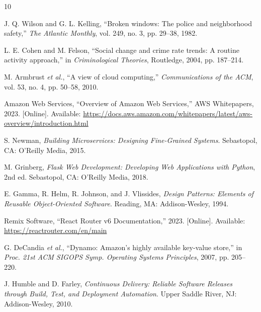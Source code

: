 \documentclass[conference]{IEEEtran}
\begin{document}
\begin{thebibliography}{10}

J. Q. Wilson and G. L. Kelling, ``Broken windows: The police and neighborhood safety,'' \textit{The Atlantic Monthly}, vol. 249, no. 3, pp. 29--38, 1982.

L. E. Cohen and M. Felson, ``Social change and crime rate trends: A routine activity approach,'' in \textit{Criminological Theories}, Routledge, 2004, pp. 187--214.

M. Armbrust \textit{et al.}, ``A view of cloud computing,'' \textit{Communications of the ACM}, vol. 53, no. 4, pp. 50--58, 2010.

Amazon Web Services, ``Overview of Amazon Web Services,'' AWS Whitepapers, 2023. [Online]. Available: \url{https://docs.aws.amazon.com/whitepapers/latest/aws-overview/introduction.html}

S. Newman, \textit{Building Microservices: Designing Fine-Grained Systems}. Sebastopol, CA: O'Reilly Media, 2015.

M. Grinberg, \textit{Flask Web Development: Developing Web Applications with Python}, 2nd ed. Sebastopol, CA: O'Reilly Media, 2018.

E. Gamma, R. Helm, R. Johnson, and J. Vlissides, \textit{Design Patterns: Elements of Reusable Object-Oriented Software}. Reading, MA: Addison-Wesley, 1994.

Remix Software, ``React Router v6 Documentation,'' 2023. [Online]. Available: \url{https://reactrouter.com/en/main}

G. DeCandia \textit{et al.}, ``Dynamo: Amazon's highly available key-value store,'' in \textit{Proc. 21st ACM SIGOPS Symp. Operating Systems Principles}, 2007, pp. 205--220.

J. Humble and D. Farley, \textit{Continuous Delivery: Reliable Software Releases through Build, Test, and Deployment Automation}. Upper Saddle River, NJ: Addison-Wesley, 2010.

\end{thebibliography}
\end{document}
